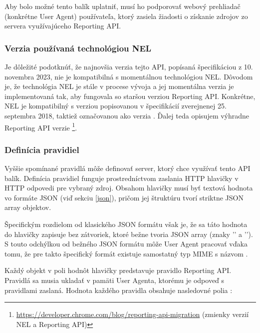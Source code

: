 Aby bolo možné tento balík uplatniť, musí ho podporovať webový prehliadač (konkrétne User Agent) používateľa, ktorý zasiela žiadosti o získanie zdrojov zo servera využívajúceho Reporting API.

\subsubsection{Verzia používaná technológiou NEL}

Je dôležité podotknúť, že najnovšia verzia tejto API, popísaná špecifikáciou z 10. novembra 2023, nie je kompatibilná s momentálnou technológiou NEL.
Dôvodom je, že technológia NEL je stále v procese vývoja a jej momentálna verzia je implementovaná tak, aby fungovala so staršou verziou Reporting API.
Konkrétne, NEL je kompatibilný s verziou popisovanou v špecifikácií zverejnenej 
25. septembra 2018, taktiež označovanou ako verzia \textbf{}.
Ďalej teda opisujem výhradne Reporting API verzie \footnote{\url{https://developer.chrome.com/blog/reporting-api-migration} (zmienky verzií NEL a Reporting API)}.

\subsubsection{Definícia pravidiel}

Vyššie spomínané pravidlá môže definovať server, ktorý chce využívať tento API balík. 
Definícia pravidiel funguje prostredníctvom zaslania HTTP hlavičky  v HTTP odpovedi pre vybraný zdroj.
Obsahom hlavičky  musí byť textová hodnota vo formáte JSON (viď sekciu \ref{json}), pričom jej štruktúru tvorí striktne JSON array objektov.

Špecifickým rozdielom od klasického JSON formátu však je, že sa táto hodnota do hlavičky
zapisuje bez zátvoriek, ktoré bežne tvoria JSON array (znaky '\code{[}' a '\code{]}').
S touto odchýlkou od bežného JSON formátu môže User Agent pracovať vďaka tomu, že pre takto špecifický formát existuje samostatný typ MIME s názvom . 

Každý objekt v poli hodnôt hlavičky  predstavuje pravidlo Reporting API.
Pravidlá sa musia ukladať v pamäti User Agenta, ktorému je odpoveď s pravidlami zaslaná.
Hodnota každého pravidla obsahuje nasledovné polia \cite{W3C-reporting-api}: 

